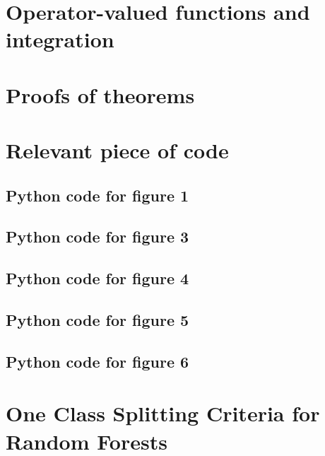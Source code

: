 
\chapter{Operator-valued functions and integration}
\label{ch:operator-valued_functions_and_integration}

\chapter{Proofs of theorems}
\label{ch:proof_of_theorems}


\chapter{Relevant piece of code}
\label{ch:relevant_piece_of_code}
\section{Python code for figure 1}
{\scriptsize
{}}

\section{Python code for figure 3}
{\scriptsize
{}}

\section{Python code for figure 4}
\label{code:efficient_decomposable_gaussian}
{\scriptsize
{}}


\section{Python code for figure 5}
\label{code:efficient_curlfree_gaussian}
{\scriptsize
{}}

\section{Python code for figure 6}
\label{code:efficient_divfree_gaussian}
{\scriptsize
{}}

\chapter{One Class Splitting Criteria for Random Forests}


